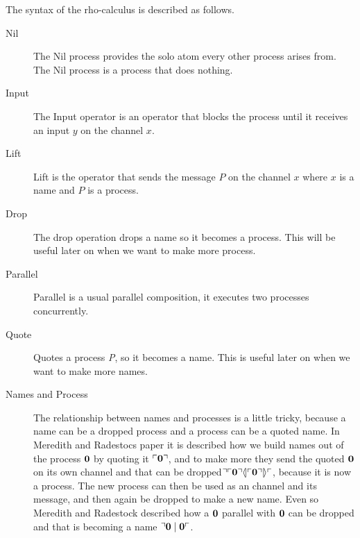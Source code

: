 The syntax of the rho-calculus is described as follows.\\

\begin{description}
    \item[Nil] The Nil process provides the solo atom every other process arises from. The Nil process is a process that does nothing.
    \item[Input] The Input operator is an operator that blocks the process until it receives an input $y$ on the channel $x$.
    \item[Lift] Lift is the operator that sends the message $P$ on the channel $x$ where $x$ is a name and $P$ is a process.
    \item[Drop] The drop operation drops a name so it becomes a process. This will be useful later on when we want to make more process.
    \item[Parallel] Parallel is a usual parallel composition, it executes two processes concurrently.
    \item[Quote] Quotes a process \textit{P}, so it becomes a name. This is useful later on when we want to make more names.
    \item[Names and Process] The relationship between names and processes is a little tricky, because a name can be a dropped process and a process can be a quoted name. In Meredith and Radestocs paper\citep{Meredith2005} it is described how we build names out of the process $\mathbf{0}$ by quoting it $\ulcorner \mathbf{0} \urcorner$, and to make more they send the quoted $\mathbf{0}$ on its own channel and that can be dropped$\urcorner \ulcorner \mathbf{0} \urcorner \langle \! | \ulcorner \mathbf{0} \urcorner | \! \rangle \ulcorner$, because it is now a process. The new process can then be used as an channel and its message, and then again be dropped to make a new name. Even so Meredith and Radestock\citep{Meredith2005} described how a $\mathbf{0}$ parallel with $\mathbf{0}$ can be dropped and that is becoming a name $\urcorner \mathbf{0} \mid \mathbf{0} \ulcorner$.
\end{description}
